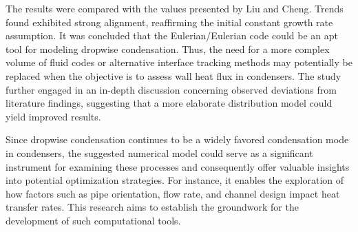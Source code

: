 \documentclass[12pt]{article}
\numberwithin{equation}{section}
\begin{document}
The results were compared with the values presented by Liu and Cheng. Trends found exhibited strong alignment, reaffirming the initial constant growth rate assumption. It was concluded that the Eulerian/Eulerian code could be an apt tool for modeling dropwise condensation. Thus, the need for a more complex volume of fluid codes or alternative interface tracking methods may potentially be replaced when the objective is to assess wall heat flux in condensers. The study further engaged in an in-depth discussion concerning observed deviations from literature findings, suggesting that a more elaborate distribution model could yield improved results.

Since dropwise condensation continues to be a widely favored condensation mode in condensers, the suggested numerical model could serve as a significant instrument for examining these processes and consequently offer valuable insights into potential optimization strategies. For instance, it enables the exploration of how factors such as pipe orientation, flow rate, and channel design impact heat transfer rates. This research aims to establish the groundwork for the development of such computational tools. 





\cleardoublepage
{}
{}



\newpage
\end{document}
